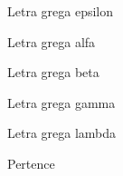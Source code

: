 \begin{simbolos}
  \item[$ \epsilon $] Letra grega epsilon
  \item[$ \alpha $] Letra grega alfa
  \item[$ \beta $] Letra grega beta
  \item[$ \gamma $] Letra grega gamma
  \item[$ \lambda $] Letra grega lambda
  \item[$ \in $] Pertence
\end{simbolos}
